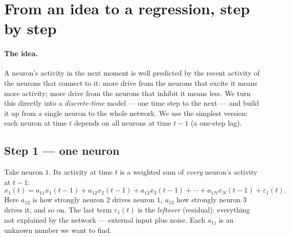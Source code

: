 \documentclass[11pt,a4paper]{article}
\begin{document}
\section{From an idea to a regression, step by step}
\label{sec:steps}

\paragraph{The idea.}
A neuron's activity in the next moment is well predicted by the recent activity
of the neurons that connect to it: more drive from the neurons that excite it
means more activity; more drive from the neurons that inhibit it means less. We
turn this directly into a \emph{discrete-time} model --- one time step to the
next --- and build it up from a single neuron to the whole network. We use the
simplest version: each neuron at time $t$ depends on all neurons at time $t-1$
(a one-step lag).

\subsection{Step 1 --- one neuron}
Take neuron $1$. Its activity at time $t$ is a weighted sum of \emph{every}
neuron's activity at $t-1$:
\begin{equation}
x_1(t) = a_{11}x_1(t{-}1) + a_{12}x_2(t{-}1) + a_{13}x_3(t{-}1)
         + \cdots + a_{1N}x_N(t{-}1) + \varepsilon_1(t).
\end{equation}
Here $a_{12}$ is how strongly neuron $2$ drives neuron $1$, $a_{13}$ how strongly
neuron $3$ drives it, and so on. The last term $\varepsilon_1(t)$ is the
\emph{leftover} (residual): everything not explained by the network --- external
input plus noise. Each $a_{1j}$ is an unknown number we want to find.
\end{document}
